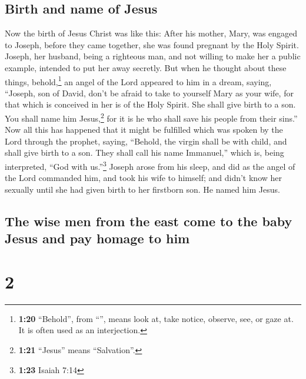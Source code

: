 \hypertarget{birth-and-name-of-jesus}{%
\subsection{Birth and name of Jesus}\label{birth-and-name-of-jesus}}

 Now the birth of Jesus Christ was like this: After his
mother, Mary, was engaged to Joseph, before they came together, she was
found pregnant by the Holy Spirit.  Joseph, her husband,
being a righteous man, and not willing to make her a public example,
intended to put her away secretly.  But when he thought
about these things, behold,\footnote{\textbf{1:20} ``Behold'', from
  ``'', means look at, take notice, observe, see, or gaze
  at. It is often used as an interjection.} an angel of the Lord
appeared to him in a dream, saying, ``Joseph, son of David, don't be
afraid to take to yourself Mary as your wife, for that which is
conceived in her is of the Holy Spirit.  She shall give
birth to a son. You shall name him Jesus,\footnote{\textbf{1:21}
  ``Jesus'' means ``Salvation''.} for it is he who shall save his people
from their sins.''  Now all this has happened that it
might be fulfilled which was spoken by the Lord through the prophet,
saying,  ``Behold, the virgin shall be with child, and
shall give birth to a son. They shall call his name Immanuel,'' which
is, being interpreted, ``God with us.''\footnote{\textbf{1:23} Isaiah
  7:14}  Joseph arose from his sleep, and did as the
angel of the Lord commanded him, and took his wife to himself;
 and didn't know her sexually until she had given birth
to her firstborn son. He named him Jesus.

\hypertarget{the-wise-men-from-the-east-come-to-the-baby-jesus-and-pay-homage-to-him}{%
\subsection{The wise men from the east come to the baby Jesus and pay
homage to
him}\label{the-wise-men-from-the-east-come-to-the-baby-jesus-and-pay-homage-to-him}}

\hypertarget{section-1}{%
\section{2}\label{section-1}}

